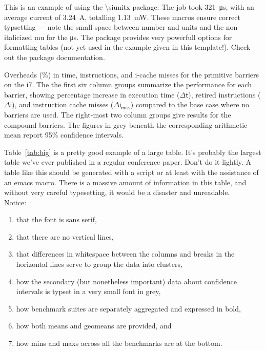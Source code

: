 This is an example of using the \textsf{\textbackslash siunitx}
package: The job took \SI{321}{\micro\second}, with an average current
of \SI{3.24}{\ampere}, totalling \SI{1.13}{\milli\watt}.  These macros
ensure correct typsetting --- note the small space between number and
units and the non-italicized mu for the \si{\micro\second}.  The
package provides very powerfull options for formatting tables (not yet
used in the example given in this template!).  Check out the package
documentation.

\begin{table}
  \newcommand{\timemetric}{$\Delta\mathsf{t}$}
  \newcommand{\instmetric}{$\Delta\mathsf{i}$}
  \newcommand{\imissmetric}{$\Delta\mathsf{i_{miss}}$}
  \newcommand{\cpimetric}{$\mathsmaller{\Delta\mathsf{t}/\Delta\mathsf{i}}$\xspace}
  \centering
   {     %
  
  }
  \caption{Overheads (\%) in time, instructions, and i-cache misses for the
    primitive barriers on the i7.  The the first six column groups summarize
    the performance for each barrier, showing percentage increase in
    execution time (\timemetric), retired instructions (\instmetric), and
    instruction cache misses (\imissmetric) compared to the base case where
    no barriers are used.  The right-most two column groups give results for
    the compound barriers.  The figures in grey beneath the corresponding
    arithmetic mean report 95\% confidence intervals.}
    \label{tab:big}
\end{table}

Table~\ref{tab:big} is a pretty good example of a large table.  It's
probably the largest table we've ever published in a regular
conference paper.  Don't do it lightly.  A table like this should be
generated with a script or at least with the assistance of an emacs
macro.  There is a massive amount of information in this table, and
without very careful typesetting, it would be a disaster and
unreadable.
\\

\noindent
Notice:
\begin{enumerate}
\item that the font is sans serif,
\item that there are no vertical lines,
\item that differences in whitespace between the columns and breaks in
  the horizontal lines serve to group the data into clusters,
\item how the secondary (but nonetheless important) data about
  confidence intervals is typset in a very small font in grey,
\item how benchmark suites are separately aggregated and expressed in
  bold,
\item how both means and geomeans are provided, and
\item how mins and maxs across all the benchmarks are at the bottom.
\end{enumerate}

